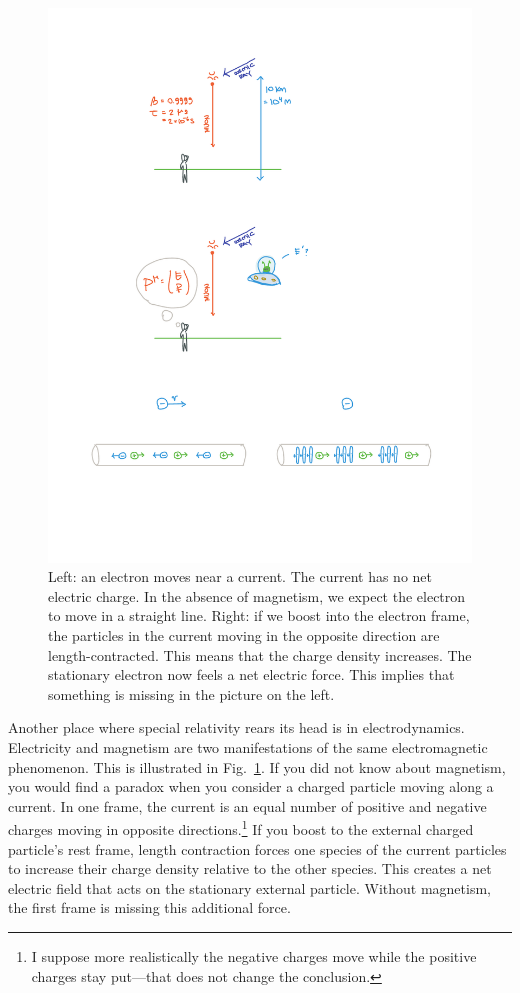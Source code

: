 \documentclass[12pt]{article}
\begin{document}
\begin{figure}[tb]
    \centering
    \includegraphics[width=.8\textwidth]{figures/EMcurrent.pdf}
    \caption{Left: an electron moves near a current. The current has no net electric charge. In the absence of magnetism, we expect the electron to move in a straight line. Right: if we boost into the electron frame, the particles in the current moving in the opposite direction are length-contracted. This means that the charge density increases. The stationary electron now feels a net electric force. This implies that something is missing in the picture on the left.}
    \label{fig:current}
\end{figure}

Another place where special relativity rears its head is in electrodynamics. Electricity and magnetism are two manifestations of the same electromagnetic phenomenon. This is illustrated in Fig.~\ref{fig:current}. If you did not know about magnetism, you would find a paradox when you consider a charged particle moving along a current. In one frame, the current is an equal number of positive and negative charges moving in opposite directions.\footnote{I suppose more realistically the negative charges move while the positive charges stay put---that does not change the conclusion.} If you boost to the external charged particle's rest frame, length contraction forces one species of the current particles to increase their charge density relative to the other species. This creates a net electric field that acts on the stationary external particle. Without magnetism, the first frame is missing this additional force. 
\end{document}
